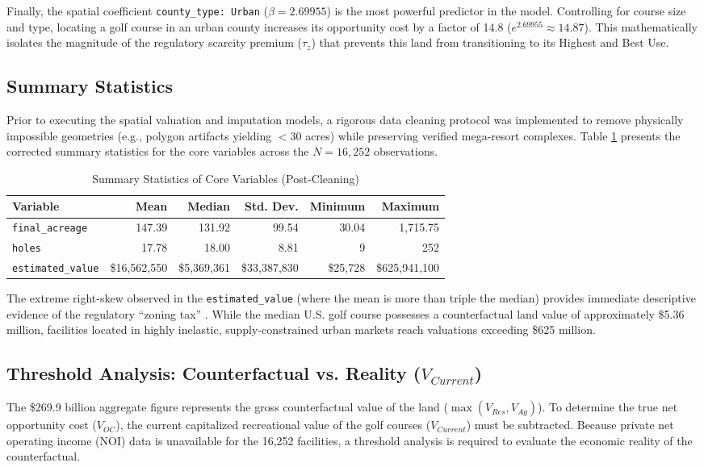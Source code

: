 \documentclass[10pt, letterpaper]{article}
\begin{document}
Finally, the spatial coefficient \texttt{county\_type: Urban} ($\beta = 2.69955$) is the most powerful predictor in the model. Controlling for course size and type, locating a golf course in an urban county increases its opportunity cost by a factor of 14.8 ($e^{2.69955} \approx 14.87$). This mathematically isolates the magnitude of the regulatory scarcity premium ($\tau_z$) that prevents this land from transitioning to its Highest and Best Use.

\subsection{Summary Statistics}
Prior to executing the spatial valuation and imputation models, a rigorous data cleaning protocol was implemented to remove physically impossible geometries (e.g., polygon artifacts yielding $<30$ acres) while preserving verified mega-resort complexes. Table \ref{tab:sum_stats} presents the corrected summary statistics for the core variables across the $N = 16,252$ observations.

\begin{table}[h!]
\centering
\caption{Summary Statistics of Core Variables (Post-Cleaning)}
\label{tab:sum_stats}
\renewcommand{\arraystretch}{1.2}
\begin{tabular}{l r r r r r}
\hline
\textbf{Variable} & \textbf{Mean} & \textbf{Median} & \textbf{Std. Dev.} & \textbf{Minimum} & \textbf{Maximum} \\
\hline
\texttt{final\_acreage} & 147.39 & 131.92 & 99.54 & 30.04 & 1,715.75 \\
\texttt{holes} & 17.78 & 18.00 & 8.81 & 9 & 252 \\
\texttt{estimated\_value} & \$16,562,550 & \$5,369,361 & \$33,387,830 & \$25,728 & \$625,941,100 \\
\hline
\end{tabular}
\end{table}

The extreme right-skew observed in the \texttt{estimated\_value} (where the mean is more than triple the median) provides immediate descriptive evidence of the regulatory ``zoning tax'' \parencite{Glaeser2005}. While the median U.S. golf course possesses a counterfactual land value of approximately \$5.36 million, facilities located in highly inelastic, supply-constrained urban markets reach valuations exceeding \$625 million.

\subsection{Threshold Analysis: Counterfactual vs. Reality ($V_{Current}$)}
The \$269.9 billion aggregate figure represents the gross counterfactual value of the land ($\max(V_{Res}, V_{Ag})$). To determine the true net opportunity cost ($V_{OC}$), the current capitalized recreational value of the golf courses ($V_{Current}$) must be subtracted. Because private net operating income (NOI) data is unavailable for the 16,252 facilities, a threshold analysis is required to evaluate the economic reality of the counterfactual.
\end{document}
